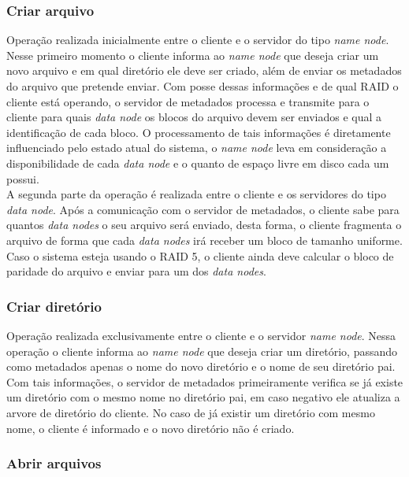 \subsubsection{Criar arquivo}

Operação realizada inicialmente entre o cliente e o servidor do tipo \textit{name node}. Nesse primeiro momento o cliente informa ao \textit{name node} que deseja criar um novo arquivo e em qual diretório ele deve ser criado, além de enviar os metadados do arquivo que pretende enviar. Com posse dessas informações e de qual RAID o cliente está operando, o servidor de metadados processa e transmite para o cliente para quais \textit{data node} os blocos do arquivo devem ser enviados e qual a identificação de cada bloco. O processamento de tais informações é diretamente influenciado pelo estado atual do sistema, o \textit{name node} leva em consideração a disponibilidade de cada \textit{data node} e o quanto de espaço livre em disco cada um possui.
\\

A segunda parte da operação é realizada entre o cliente e os servidores do tipo \textit{data node}. Após a comunicação com o servidor de metadados, o cliente sabe para quantos \textit{data nodes} o seu arquivo será enviado, desta forma, o cliente fragmenta o arquivo de forma que cada \textit{data nodes} irá receber um bloco de tamanho uniforme. Caso o sistema esteja usando o RAID 5, o cliente ainda deve calcular o bloco de paridade do arquivo e enviar para um dos \textit{data nodes}.
\\

\subsubsection{Criar diretório}

Operação realizada exclusivamente entre o cliente e o servidor \textit{name node}. Nessa operação o cliente informa ao \textit{name node} que deseja criar um diretório, passando como metadados apenas o nome do novo diretório e o nome de seu diretório pai. Com tais informações, o servidor de metadados primeiramente verifica se já existe um diretório com o mesmo nome no diretório pai, em caso negativo ele atualiza a arvore de diretório do cliente. No caso de já existir um diretório com mesmo nome, o cliente é informado e o novo diretório não é criado.
\\

\subsubsection{Abrir arquivos}

